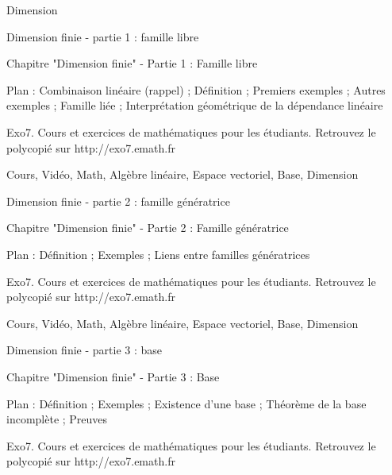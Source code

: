 
   Dimension




Dimension finie - partie 1 : famille libre



Chapitre "Dimension finie" - Partie 1 : Famille libre

Plan : Combinaison linéaire (rappel) ; Définition ; Premiers exemples ;
Autres exemples ; Famille liée ; Interprétation géométrique de la dépendance linéaire

Exo7. Cours et exercices de mathématiques pour les étudiants.
Retrouvez le polycopié sur http://exo7.emath.fr


Cours, Vidéo, Math, Algèbre linéaire, Espace vectoriel, Base, Dimension




Dimension finie - partie 2 : famille génératrice



Chapitre "Dimension finie" - Partie 2 : Famille génératrice

Plan : Définition ; Exemples ; Liens entre familles génératrices

Exo7. Cours et exercices de mathématiques pour les étudiants.
Retrouvez le polycopié sur http://exo7.emath.fr


Cours, Vidéo, Math, Algèbre linéaire, Espace vectoriel, Base, Dimension



Dimension finie - partie 3 : base



Chapitre "Dimension finie" - Partie 3 : Base

Plan : Définition ; Exemples ; Existence d'une base ;
Théorème de la base incomplète ; Preuves

Exo7. Cours et exercices de mathématiques pour les étudiants.
Retrouvez le polycopié sur http://exo7.emath.fr


